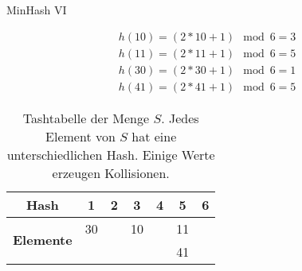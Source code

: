 \begin{frame}{MinHash VI}
    \begin{example}
        \begin{equation*}
            \begin{split}
                h(10) = (2 * 10 + 1) \mod 6 = 3 \\
                h(11) = (2 * 11 + 1) \mod 6 = 5 \\
                h(30) = (2 * 30 + 1) \mod 6 = 1 \\
                h(41) = (2 * 41 + 1) \mod 6 = 5
            \end{split}
        \end{equation*}
    \end{example}
    
        \begin{table}[H]
            \centering
            \begin{tabular}{| c | c | c | c | c | c | c |}
                \hline
                \textbf{Hash} & \textbf{1} & \textbf{2} & \textbf{3} & \textbf{4} & \textbf{5} & \textbf{6}  \\
                \hline
                \multirow{2}{*}{\textbf{Elemente}}   & 30 &    & 10 &    & 11 & \\
                &    &    &    &    & 41  &\\
                \hline
            \end{tabular}    
            \caption{Tashtabelle der Menge $ S $. Jedes Element von $ S $ hat eine unterschiedlichen Hash. Einige Werte erzeugen Kollisionen.}
        \end{table} 
\end{frame}